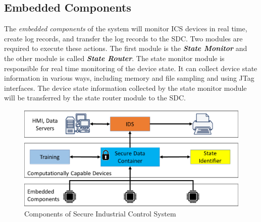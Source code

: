\documentclass[conference]{IEEEtran}
\begin{document}
\subsection{Embedded Components}
The {\em embedded components} of the system will monitor ICS devices in real time, create log records, and transfer the log records to the SDC. Two modules are required to execute these actions. The first module is the \textit{\textbf{State Monitor}} and the other module is called \textit{\textbf{State Router}}. The state monitor module is responsible for real time monitoring of the device state. It can collect device state information in various ways, including memory and file sampling and using JTag interfaces. The device state information collected by the state monitor module will be transferred by the state router module to the SDC. 

\begin{figure}[htbp]
\centering
\centerline{\includegraphics [width=.5\textwidth]{sec_scada.png}}
\caption{Components of Secure Industrial Control System }
\label{sec_ics}
\end{figure}
\end{document}
